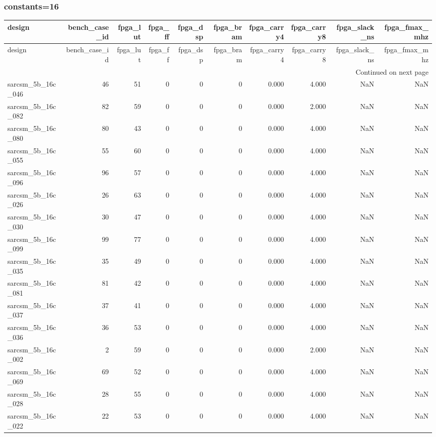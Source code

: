 \documentclass{article}
\begin{document}
\subsubsection*{constants=16}
\begin{longtable}{lrrrrrrrrr}
\toprule
design & bench\_case\_id & fpga\_lut & fpga\_ff & fpga\_dsp & fpga\_bram & fpga\_carry4 & fpga\_carry8 & fpga\_slack\_ns & fpga\_fmax\_mhz \\
\midrule
\endfirsthead
\toprule
design & bench\_case\_id & fpga\_lut & fpga\_ff & fpga\_dsp & fpga\_bram & fpga\_carry4 & fpga\_carry8 & fpga\_slack\_ns & fpga\_fmax\_mhz \\
\midrule
\endhead
\midrule
\multicolumn{10}{r}{Continued on next page} \\
\midrule
\endfoot
\bottomrule
\endlastfoot
sarcsm\_5b\_16c\_046 & 46 & 51 & 0 & 0 & 0 & 0.000 & 4.000 & NaN & NaN \\
sarcsm\_5b\_16c\_082 & 82 & 59 & 0 & 0 & 0 & 0.000 & 2.000 & NaN & NaN \\
sarcsm\_5b\_16c\_080 & 80 & 43 & 0 & 0 & 0 & 0.000 & 4.000 & NaN & NaN \\
sarcsm\_5b\_16c\_055 & 55 & 60 & 0 & 0 & 0 & 0.000 & 4.000 & NaN & NaN \\
sarcsm\_5b\_16c\_096 & 96 & 57 & 0 & 0 & 0 & 0.000 & 4.000 & NaN & NaN \\
sarcsm\_5b\_16c\_026 & 26 & 63 & 0 & 0 & 0 & 0.000 & 4.000 & NaN & NaN \\
sarcsm\_5b\_16c\_030 & 30 & 47 & 0 & 0 & 0 & 0.000 & 4.000 & NaN & NaN \\
sarcsm\_5b\_16c\_099 & 99 & 77 & 0 & 0 & 0 & 0.000 & 4.000 & NaN & NaN \\
sarcsm\_5b\_16c\_035 & 35 & 49 & 0 & 0 & 0 & 0.000 & 4.000 & NaN & NaN \\
sarcsm\_5b\_16c\_081 & 81 & 42 & 0 & 0 & 0 & 0.000 & 4.000 & NaN & NaN \\
sarcsm\_5b\_16c\_037 & 37 & 41 & 0 & 0 & 0 & 0.000 & 4.000 & NaN & NaN \\
sarcsm\_5b\_16c\_036 & 36 & 53 & 0 & 0 & 0 & 0.000 & 4.000 & NaN & NaN \\
sarcsm\_5b\_16c\_002 & 2 & 59 & 0 & 0 & 0 & 0.000 & 2.000 & NaN & NaN \\
sarcsm\_5b\_16c\_069 & 69 & 52 & 0 & 0 & 0 & 0.000 & 4.000 & NaN & NaN \\
sarcsm\_5b\_16c\_028 & 28 & 55 & 0 & 0 & 0 & 0.000 & 4.000 & NaN & NaN \\
sarcsm\_5b\_16c\_022 & 22 & 53 & 0 & 0 & 0 & 0.000 & 4.000 & NaN & NaN \\

\end{longtable}
\end{document}
